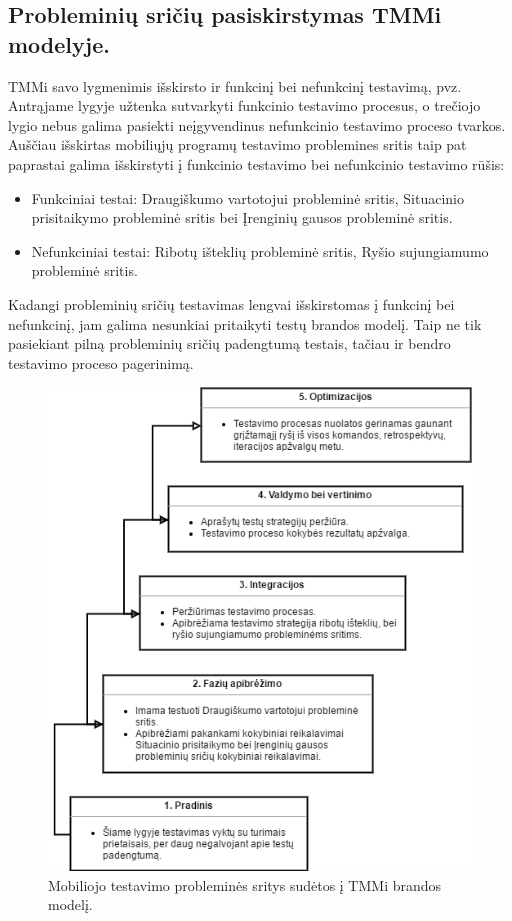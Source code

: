 \documentclass{VUMIFPSkursinis}
\begin{document}
\subsection{Probleminių sričių pasiskirstymas TMMi modelyje.}
TMMi savo lygmenimis išskirsto ir funkcinį bei nefunkcinį testavimą, pvz. Antrąjame lygyje užtenka sutvarkyti funkcinio testavimo procesus, o trečiojo lygio nebus galima pasiekti neįgyvendinus nefunkcinio testavimo proceso tvarkos. Auščiau išskirtas mobiliųjų programų testavimo problemines sritis taip pat paprastai galima išskirstyti į funkcinio testavimo bei nefunkcinio testavimo rūšis:
\begin{itemize}
   \item Funkciniai testai: Draugiškumo vartotojui probleminė sritis, Situacinio prisitaikymo probleminė sritis bei Įrenginių gausos probleminė sritis.
   \item Nefunkciniai testai: Ribotų išteklių probleminė sritis, Ryšio sujungiamumo probleminė sritis.
\end{itemize}
Kadangi probleminių sričių testavimas lengvai išskirstomas į funkcinį bei nefunkcinį, jam galima nesunkiai pritaikyti testų brandos modelį. Taip ne tik pasiekiant pilną probleminių sričių padengtumą testais, tačiau ir bendro testavimo proceso pagerinimą.

\begin{figure}[H]
    \centering
    \includegraphics[scale=0.85]{img/Tmmimobile}
    \caption{Mobiliojo testavimo probleminės sritys sudėtos į TMMi brandos modelį.}
    \label{img:tmmimobile}
\end{figure}
\end{document}
